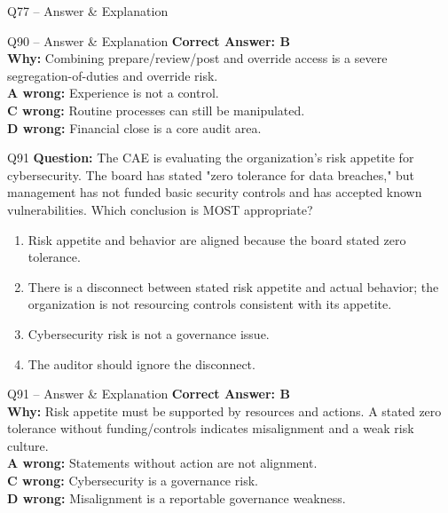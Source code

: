 \documentclass[aspectratio=169,10pt]{beamer}
\begin{document}
\begin{frame}[t]{Q77 -- Answer \& Explanation}
	\begin{frame}[t]{Q90 -- Answer \& Explanation}
		\small
		\textbf{Correct Answer: B} \\[4pt]
		\textbf{Why:} Combining prepare/review/post and override access is a severe segregation-of-duties and override risk. \\[4pt]
		\textbf{A wrong:} Experience is not a control. \\[2pt]
		\textbf{C wrong:} Routine processes can still be manipulated. \\[2pt]
		\textbf{D wrong:} Financial close is a core audit area.
	\end{frame}
	
	\begin{frame}[t]{Q91}
		\small
		\textbf{Question:} The CAE is evaluating the organization's risk appetite for cybersecurity. The board has stated "zero tolerance for data breaches," but management has not funded basic security controls and has accepted known vulnerabilities. Which conclusion is MOST appropriate?
		\begin{enumerate}[label=\Alph*.,itemsep=1pt,topsep=2pt]
			\item Risk appetite and behavior are aligned because the board stated zero tolerance.
			\item There is a disconnect between stated risk appetite and actual behavior; the organization is not resourcing controls consistent with its appetite.
			\item Cybersecurity risk is not a governance issue.
			\item The auditor should ignore the disconnect.
		\end{enumerate}
	\end{frame}
	
	\begin{frame}[t]{Q91 -- Answer \& Explanation}
		\small
		\textbf{Correct Answer: B} \\[4pt]
		\textbf{Why:} Risk appetite must be supported by resources and actions. A stated zero tolerance without funding/controls indicates misalignment and a weak risk culture. \\[4pt]
		\textbf{A wrong:} Statements without action are not alignment. \\[2pt]
		\textbf{C wrong:} Cybersecurity is a governance risk. \\[2pt]
		\textbf{D wrong:} Misalignment is a reportable governance weakness.
	\end{frame}
	

\end{frame}
\end{document}
